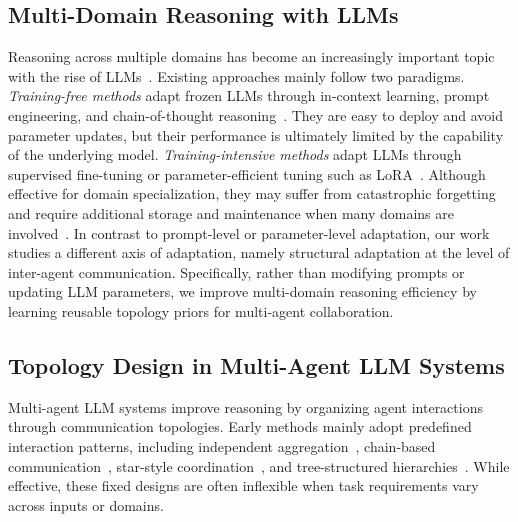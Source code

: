 \documentclass[lettersize,journal]{IEEEtran}
\theoremstyle{plain}
\begin{document}
\subsection{Multi-Domain Reasoning with LLMs}
Reasoning across multiple domains has become an increasingly important topic with the rise of LLMs~\cite{DBLP:conf/acl/KwanZ0SLJS0W24,DBLP:conf/acl/Chen0ZC0C24,DBLP:conf/acl/0004SSDYGSANMP25}. Existing approaches mainly follow two paradigms. \emph{Training-free methods} adapt frozen LLMs through in-context learning, prompt engineering, and chain-of-thought reasoning~\cite{DBLP:conf/nips/ChenHWJ23,multi_domain_kt,DBLP:conf/emnlp/NguyenLZZY23,DBLP:conf/emnlp/Hu0YXW024}. They are easy to deploy and avoid parameter updates, but their performance is ultimately limited by the capability of the underlying model. \emph{Training-intensive methods} adapt LLMs through supervised fine-tuning or parameter-efficient tuning such as LoRA~\cite{DBLP:conf/iclr/HuSWALWWC22}. Although effective for domain specialization, they may suffer from catastrophic forgetting and require additional storage and maintenance when many domains are involved~\cite{DBLP:journals/corr/abs-2410-10181,DBLP:journals/corr/abs-2509-16882,DBLP:conf/icml/Liang00LWCH25,DBLP:journals/pami/LiYDZS24}. In contrast to prompt-level or parameter-level adaptation, our work studies a different axis of adaptation, namely structural adaptation at the level of inter-agent communication. Specifically, rather than modifying prompts or updating LLM parameters, we improve multi-domain reasoning efficiency by learning reusable topology priors for multi-agent collaboration.

\subsection{Topology Design in Multi-Agent LLM Systems}
Multi-agent LLM systems improve reasoning by organizing agent interactions through communication topologies. Early methods mainly adopt predefined interaction patterns, including independent aggregation~\cite{DBLP:conf/acl/Jiang0L23,DBLP:conf/acl/ZhangX0LHD24,DBLP:conf/icml/Du00TM24}, chain-based communication~\cite{DBLP:journals/corr/abs-2310-02003,DBLP:conf/acl/QianLLCDL0CSCXL24,DBLP:conf/iclr/HongZCZCWZWYLZR24}, star-style coordination~\cite{wu2024autogen,DBLP:journals/corr/abs-2311-13373}, and tree-structured hierarchies~\cite{DBLP:journals/corr/abs-2404-02183}. While effective, these fixed designs are often inflexible when task requirements vary across inputs or domains.
\end{document}
